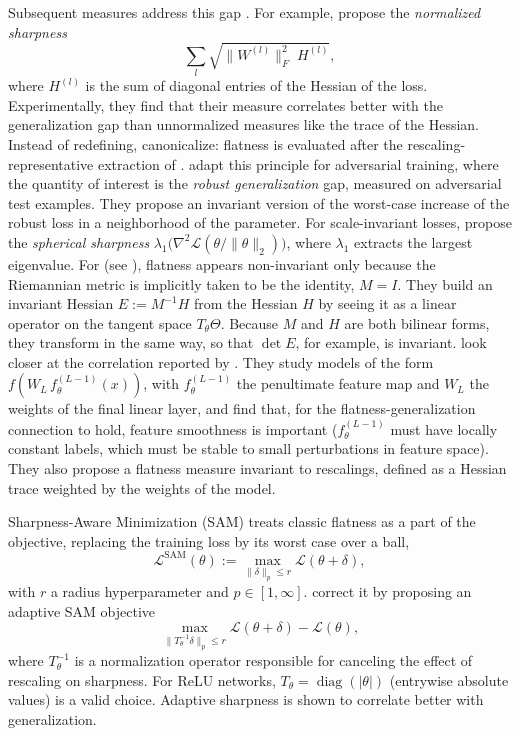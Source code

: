 \documentclass[mathematics,review,submit,moreauthors]{Definitions/mdpi}
\begin{document}
Subsequent measures address this gap \citep{tsuzuku2019,yi2019,petzka2021anips}.
For example, \citet{tsuzuku2019} propose the \emph{normalized sharpness}
\begin{equation*}
    \sum_{l}\sqrt{\lVert W^{(l)}\rVert_F^2\;H^{(l)}},
\end{equation*}
where $H^{(l)}$ is the sum of diagonal entries of the Hessian of the loss.
Experimentally, they find that their measure correlates better with the generalization gap than unnormalized measures like the trace of the Hessian.
Instead of redefining, \citet{pittorino2022jsm} canonicalize: flatness is evaluated after the rescaling-representative extraction of .
\citet{stutz2021} adapt this principle for adversarial training, where the quantity of interest is the \emph{robust generalization} gap, measured on adversarial test examples.
They propose an invariant version of the worst-case increase of the robust loss in a neighborhood of the parameter.
For scale-invariant losses, \citet{lyu2023} propose the \emph{spherical sharpness} $\lambda_1\big(\nabla^2\mathcal{L}(\theta/\lVert\theta\rVert_2)\big)$, where $\lambda_1$ extracts the largest eigenvalue.
For \citet{kristiadi2023anips} (see ), flatness appears non-invariant only because the Riemannian metric is implicitly taken to be the identity, $M=I$.
They build an invariant Hessian $E:=M^{-1}H$ from the Hessian $H$ by seeing it as a linear operator on the tangent space $T_\theta\Theta$.
Because $M$ and $H$ are both bilinear forms, they transform in the same way, so that $\det E$, for example, is invariant.
\citet{petzka2021anips} look closer at the correlation reported by \citet{keskar2017}.
They study models of the form $f(W_L\,f_\theta^{(L-1)}(x))$, with $f_\theta^{(L-1)}$ the penultimate feature map and $W_L$ the weights of the final linear layer, and find that, for the flatness-generalization connection to hold, feature smoothness is important ($f_\theta^{(L-1)}$ must have locally constant labels, which must be stable to small perturbations in feature space).
They also propose a flatness measure invariant to rescalings, defined as a Hessian trace weighted by the weights of the model.

Sharpness-Aware Minimization (SAM) \citep{foret2021} treats classic flatness as a part of the objective, replacing the training loss by its worst case over a ball,
\begin{equation*}
    \mathcal{L}^{\mathrm{SAM}}(\theta):=\max_{\lVert\delta\rVert_p\le r}\mathcal{L}(\theta+\delta),
\end{equation*}
with $r$ a radius hyperparameter and $p\in[1,\infty]$.
\citet{kwon2021p3icml} correct it by proposing an adaptive SAM objective
\begin{equation*}
    \max_{\lVert T_\theta^{-1}\delta\rVert_p\le r}\mathcal{L}(\theta+\delta)-\mathcal{L}(\theta),
\end{equation*}
where $T_\theta^{-1}$ is a normalization operator responsible for canceling the effect of rescaling on sharpness.
For ReLU networks, $T_\theta=\operatorname{diag}(|\theta|)$ (entrywise absolute values) is a valid choice.
Adaptive sharpness is shown to correlate better with generalization.
\end{document}

